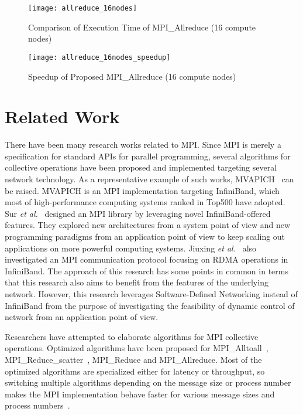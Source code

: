 \begin{figure}
    \centering
    \texttt{[image: allreduce\_16nodes]}
    \caption{Comparison of Execution Time of MPI\_Allreduce (16 compute nodes)}%
    \label{fig:evaluation-16nodes}
\end{figure}

\begin{figure}
    \centering
    \texttt{[image: allreduce\_16nodes\_speedup]}
    \caption{Speedup of Proposed MPI\_Allreduce (16 compute nodes)}%
    \label{fig:evaluation-16nodes-normalized}
\end{figure}

\section{Related Work}\label{sec:iii-related-work}

There have been many research works related to MPI\@. Since MPI is merely a
specification for standard APIs for parallel programming, several algorithms
for collective operations have been proposed and implemented targeting several
network technology. As a representative example of such works,
MVAPICH~\autocite{mvapich} can be raised. MVAPICH is an MPI implementation
targeting InfiniBand, which most of high-performance computing systems ranked
in Top500 have adopted. Sur \emph{et al.}~\autocite{Sur2011} designed an MPI
library by leveraging novel InfiniBand-offered features. They explored new
architectures from a system point of view and new programming paradigms from
an application point of view to keep scaling out applications on more powerful
computing systems. Jiuxing \emph{et al.}~\autocite{Jiuxing2004} also
investigated an MPI communication protocol focusing on RDMA operations in
InfiniBand. The approach of this research has some points in common in terms
that this research also aims to benefit from the features of the underlying
network. However, this research leverages Software-Defined Networking instead
of InfiniBand from the purpose of investigating the feasibility of dynamic
control of network from an application point of view.

Researchers have attempted to elaborate algorithms for MPI collective
operations. Optimized algorithms have been proposed for
MPI\_Alltoall~\autocite{Bruck1997},
MPI\_Reduce\_scatter~\autocite{Iannello1997}, MPI\_Reduce and MPI\_Allreduce.
Most of the optimized algorithms are specialized either for latency or
throughput, so switching multiple algorithms depending on the message size or
process number makes the MPI implementation behave faster for various message
sizes and process numbers~\autocite{Thakur2005}.

